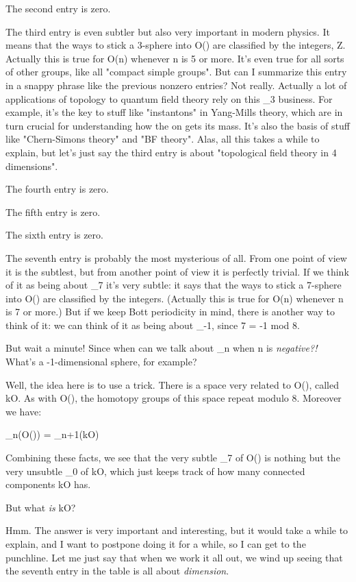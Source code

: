 The second entry is zero.  

The third entry is even subtler but also very important in modern
physics.  It means that the ways to stick a 3-sphere into O(\infty )
are classified by the integers, Z.  Actually this is true for O(n)
whenever n is 5 or more.  It's even true for all sorts of other
groups, like all "compact simple groups".  But can I summarize this
entry in a snappy phrase like the previous nonzero entries?  Not
really.  Actually a lot of applications of topology to quantum field
theory rely on this \pi _{3} business.  For example, it's the key to stuff
like "instantons" in Yang-Mills theory, which are in turn crucial for
understanding how the \pi on gets its mass.  It's also the basis of
stuff like "Chern-Simons theory" and "BF theory".  Alas, all this
takes a while to explain, but let's just say the third entry is about
"topological field theory in 4 dimensions".

The fourth entry is zero.

The fifth entry is zero.

The sixth entry is zero.

The seventh entry is probably the most mysterious of all.  From one
point of view it is the subtlest, but from another point of view it is
perfectly trivial.   If we think of it as being about \pi _{7} it's very
subtle: it says that the ways to stick a 7-sphere into O(\infty ) are
classified by the integers.   (Actually this is true for O(n) whenever
n is 7 or more.)  But if we keep Bott periodicity in mind, there is
another way to think of it: we can think of it as being about \pi _{-1},
since 7 = -1 mod 8.  

But wait a minute!  Since when can we talk about \pi _{n} when n is
\emph{negative?!}  What's a -1-dimensional sphere, for example?

Well, the idea here is to use a trick.  There is a space very related
to O(\infty ), called kO.   As with O(\infty ), the homotopy
groups of this space repeat modulo 8.  Moreover we have:

\pi _{n}(O(\infty )) = \pi _{n+1}(kO)

Combining these facts, we see that the very subtle \pi _{7} of O(\infty )
is nothing but the very unsubtle \pi _{0} of kO, which just
keeps track of how many connected components kO has.

But what \emph{is} kO?   

Hmm.  The answer is very important and interesting, but it would
take a while to explain, and I want to postpone doing it for a while,
so I can get to the punchline.  Let me just say that when we work
it all out, we wind up seeing that the seventh entry in the table
is all about \emph{dimension}.  

